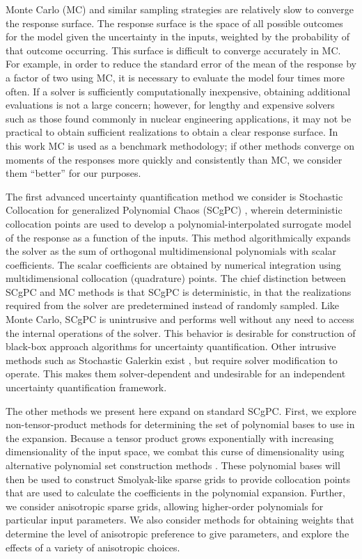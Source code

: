 Monte Carlo (MC) and similar sampling strategies are relatively slow to converge the response surface.  The
response surface is the space of all possible outcomes for the model given the uncertainty in the inputs,
weighted by the probability of that outcome occurring. This surface is difficult to converge accurately in MC.  For
example, in order to reduce the standard error of the mean of the response by a factor
of two using MC, it is necessary to evaluate the model four times more often.  If a solver is sufficiently computationally
inexpensive, obtaining additional evaluations is not a large concern; however, for lengthy and expensive
solvers such as those found commonly in nuclear engineering applications,
it may not be practical to obtain sufficient realizations to obtain a clear response surface.
In this work MC is used as a benchmark methodology; if other methods converge on moments of the responses
more quickly and consistently than MC, we consider them ``better'' for our purposes.

The first advanced uncertainty quantification  method we consider is Stochastic Collocation for generalized Polynomial
Chaos (SCgPC) \cite{sparseSC,sparse1,sparse2,xiu}, wherein deterministic collocation points 
are used to develop a polynomial-interpolated surrogate model
of the response as a function of the inputs.  This method algorithmically expands the solver as the sum of
orthogonal multidimensional polynomials with scalar coefficients.  The scalar coefficients are obtained by
numerical integration using multidimensional collocation (quadrature) points.  The chief distinction between
SCgPC and MC methods is that SCgPC is deterministic, in that the realizations required from the
solver are predetermined instead of randomly sampled.
Like Monte Carlo, SCgPC is unintrusive
and performs well without any need to access the internal operations of the solver.  This behavior is desirable for
construction of black-box approach algorithms for uncertainty quantification.  Other intrusive methods such as
Stochastic Galerkin exist \cite{galerkin}, but require solver modification to operate.  This makes them
solver-dependent and undesirable for an independent uncertainty quantification framework.

The other methods we present here expand on standard
SCgPC.  First, we explore non-tensor-product methods for determining the set of polynomial bases to
use in the expansion.  Because a tensor product grows exponentially with increasing dimensionality of the input
space, we combat this curse of dimensionality using
alternative polynomial set construction methods \cite{hctd}.
These polynomial bases will then be used to construct Smolyak-like sparse grids \cite{smolyak} to provide collocation
points that are used to calculate the coefficients in the polynomial expansion.  Further, we consider
anisotropic sparse grids,
allowing higher-order polynomials for particular input parameters.  We also consider methods for
obtaining weights that determine the level of anisotropic preference to give parameters, and explore the effects of a
variety of anisotropic choices.

